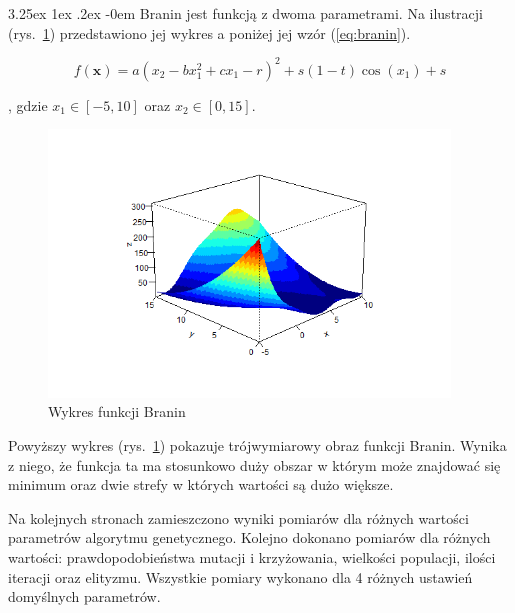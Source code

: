 \documentclass[11pt, a4paper]{article}
\makeatletter
\newcommand{\fbi}{\leavevmode{\parindent=1em\indent}}
\renewcommand\paragraph{\@startsection{paragraph}{5}{\z@}
  {3.25ex \@plus1ex \@minus.2ex}
  {-0em}
  {\normalfont\normalsize\bfseries}}
\makeatother
\begin{document}
\paragraph{}
Branin jest funkcją z dwoma parametrami. Na ilustracji (rys.~\ref{fig:branin1}) przedstawiono jej wykres a poniżej jej wzór (\ref{eq:branin}).

\begin{equation}\label{eq:branin}
	f(\boldsymbol{x}) = a(x_2 - bx_1^2 + cx_1 - r)^2 + s(1 - t)\cos(x_1) + s
\end{equation}

, gdzie $ x_1 \in [-5, 10] $ oraz $ x_2 \in [0, 15] $.

\begin{figure}[H]
	\centering
	\includegraphics[width=0.95\textwidth]{./assets/Branin1.png}
	\caption{Wykres funkcji Branin}
	\label{fig:branin1}
\end{figure}

\fbi
Powyższy wykres (rys.~\ref{fig:branin1}) pokazuje trójwymiarowy obraz funkcji Branin. Wynika z niego, że funkcja ta ma stosunkowo duży obszar w którym może znajdować się minimum oraz dwie strefy w których wartości są dużo większe.

\fbi
Na kolejnych stronach zamieszczono wyniki pomiarów dla różnych wartości parametrów algorytmu genetycznego. Kolejno dokonano pomiarów dla różnych wartości: prawdopodobieństwa mutacji i krzyżowania, wielkości populacji, ilości iteracji oraz elityzmu. Wszystkie pomiary wykonano dla 4 różnych ustawień domyślnych parametrów.
\end{document}
